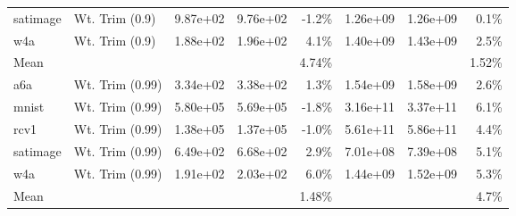 \begin{table*}[ht]
\begin{center}
\begin{small}
\begin{sc}
\begin{tabular}{llccrccr}
satimage & Wt. Trim (0.9) & 9.87e+02 & 9.76e+02 & -1.2\%  & 1.26e+09 & 1.26e+09 & 0.1\%  \\
w4a & Wt. Trim (0.9) & 1.88e+02 & 1.96e+02 & 4.1\% & 1.40e+09 & 1.43e+09 & 2.5\% \\
\midrule
Mean &  & &  & 4.74\% & & & 1.52\% \\
\midrule
a6a & Wt. Trim (0.99) & 3.34e+02 & 3.38e+02 & 1.3\%  & 1.54e+09 & 1.58e+09 & 2.6\%  \\
mnist & Wt. Trim (0.99) &  5.80e+05 & 5.69e+05 & -1.8\% & 3.16e+11 & 3.37e+11 & 6.1\% \\
rcv1 & Wt. Trim (0.99) & 1.38e+05 & 1.37e+05 & -1.0\% & 5.61e+11 & 5.86e+11 & 4.4\% \\
satimage & Wt. Trim (0.99) & 6.49e+02 & 6.68e+02 & 2.9\%  & 7.01e+08 & 7.39e+08 & 5.1\%  \\
w4a & Wt. Trim (0.99) & 1.91e+02 & 2.03e+02 & 6.0\% & 1.44e+09 & 1.52e+09 & 5.3\% \\
\midrule
Mean &  & &  & 1.48\% & & & 4.7\% \\
\bottomrule
\end{tabular}
\end{sc}
\end{small}
\end{center}
\vskip -0.1in
\end{table*}


